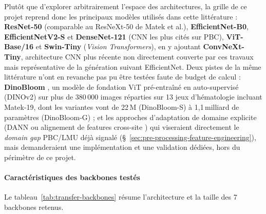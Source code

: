 Plutôt que d'explorer arbitrairement l'espace des architectures, la grille de ce projet reprend donc les principaux modèles utilisés dans cette littérature : \textbf{ResNet-50} (comparable au ResNeXt-50 de Matek et al.), \textbf{EfficientNet-B0}, \textbf{EfficientNetV2-S} et \textbf{DenseNet-121} (CNN les plus cités sur PBC), \textbf{ViT-Base/16} et \textbf{Swin-Tiny} (\emph{Vision Transformers}), en y ajoutant \textbf{ConvNeXt-Tiny}, architecture CNN plus récente non directement couverte par ces travaux mais représentative de la génération suivant EfficientNet.
Deux pistes de la même littérature n'ont en revanche pas pu être testées faute de budget de calcul : \textbf{DinoBloom} \parencite{koch2024dinobloom}, un modèle de fondation ViT pré-entraîné en auto-supervisé (DINOv2) sur plus de 380\,000 images réparties sur 13 jeux d'hématologie incluant Matek-19, dont les variantes vont de 22\,M (DinoBloom-S) à 1,1\,milliard de paramètres (DinoBloom-G) ; et les approches d'adaptation de domaine explicite (DANN \parencite{ganin2016dann} ou alignement de features cross-site \parencite{gao2025danet,sadafi2023continual}) qui viseraient directement le \emph{domain gap} PBC/LMU déjà signalé (\S~\ref{sec:pre-processing-feature-engineering}), mais demanderaient une implémentation et une validation dédiées, hors du périmètre de ce projet.

\paragraph{Caractéristiques des backbones testés}

Le tableau~\ref{tab:transfer-backbones} résume l'architecture et la taille des 7 backbones retenus.

